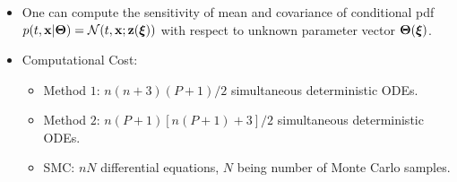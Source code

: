 \documentclass{beamer}
\begin{document}
\begin{frame}\frametitle{\color{black}{Proposed Approach}}\framesubtitle{\color{white}{$\dot{\x} = \A(\Th)\x + \B(\Th)\u+ \G(\Th)\et$}}
\transboxin

\begin{figure}\vspace{-0.22in}\centering
{}
\end{figure}
\end{frame}
\begin{frame}\frametitle{\color{black}{Proposed Approach}}\framesubtitle{\color{white}{$\dot{\x} = \A(\Th)\x + \B(\Th)\u+ \G(\Th)\et$}}
\begin{figure}\vspace{-0.22in}\centering
{}
\end{figure}
\end{frame}

\begin{frame}\frametitle{\color{black}{Proposed Approach}}\framesubtitle{\color{white}{Advantages}}
\begin{itemize}
\item One can compute the sensitivity of mean and covariance of conditional pdf $p(t,\mathbf{x}|\boldsymbol{\Theta}) = \mathcal{N}(t,\mathbf{x};\mathbf{z}(\boldsymbol{\xi}))$ with respect to unknown parameter vector $\boldsymbol{\Theta}(\boldsymbol{\xi})$.
\item \alert{Computational Cost:}
\begin{itemize}
\item Method $1$: $n(n+3)(P+1)/2$ simultaneous deterministic ODEs.
\item Method $2$: $n(P+1)\left[n(P+1)+3\right]/2$ simultaneous deterministic ODEs.
\item SMC: $nN$ differential equations, $N$ being number of Monte Carlo samples.
\end{itemize}
\end{itemize}
\end{frame}
\end{document}
